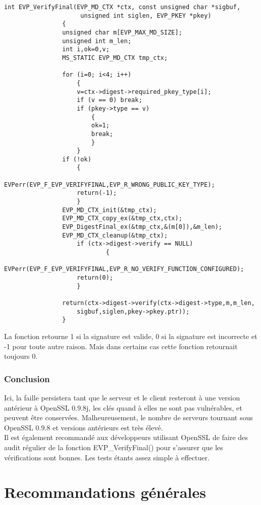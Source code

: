 		
			\begin{lstlisting}[style=customc,caption=codeAleatoire.c, label=codeAleatoire]
				int EVP_VerifyFinal(EVP_MD_CTX *ctx, const unsigned char *sigbuf,
				     unsigned int siglen, EVP_PKEY *pkey)
				{
				unsigned char m[EVP_MAX_MD_SIZE];
				unsigned int m_len;
				int i,ok=0,v;
				MS_STATIC EVP_MD_CTX tmp_ctx;

				for (i=0; i<4; i++)
					{
					v=ctx->digest->required_pkey_type[i];
					if (v == 0) break;
					if (pkey->type == v)
						{
						ok=1;
						break;
						}
					}
				if (!ok)
					{
					EVPerr(EVP_F_EVP_VERIFYFINAL,EVP_R_WRONG_PUBLIC_KEY_TYPE);
					return(-1);
					}
				EVP_MD_CTX_init(&tmp_ctx);
				EVP_MD_CTX_copy_ex(&tmp_ctx,ctx);     
				EVP_DigestFinal_ex(&tmp_ctx,&(m[0]),&m_len);
				EVP_MD_CTX_cleanup(&tmp_ctx);
			        if (ctx->digest->verify == NULL)
			                {
					EVPerr(EVP_F_EVP_VERIFYFINAL,EVP_R_NO_VERIFY_FUNCTION_CONFIGURED);
					return(0);
					}

				return(ctx->digest->verify(ctx->digest->type,m,m_len,
					sigbuf,siglen,pkey->pkey.ptr));
				}
			\end{lstlisting}     

			La fonction retourne 1 si la signature est valide, 0 si la signature est incorrecte et -1 pour toute autre raison. Mais dans certains cas cette fonction retournait toujours 0.
	
		\subsubsection{Conclusion}

			Ici, la faille persistera tant que le serveur et le client resteront à une version antérieur à OpenSSL 0.9.8j, les clés quand à elles ne sont pas vulnérables, et peuvent être conservées. Malheureusement, le nombre de serveurs tournant sous OpenSSL 0.9.8 et versions antérieurs est très élevé.\\

			Il est également recommandé aux développeurs utilisant OpenSSL de faire des audit régulier de la fonction EVP\_VerifyFinal() pour s'assurer que les vérifications sont bonnes. Les tests étants assez simple à effectuer.

\section{Recommandations générales}